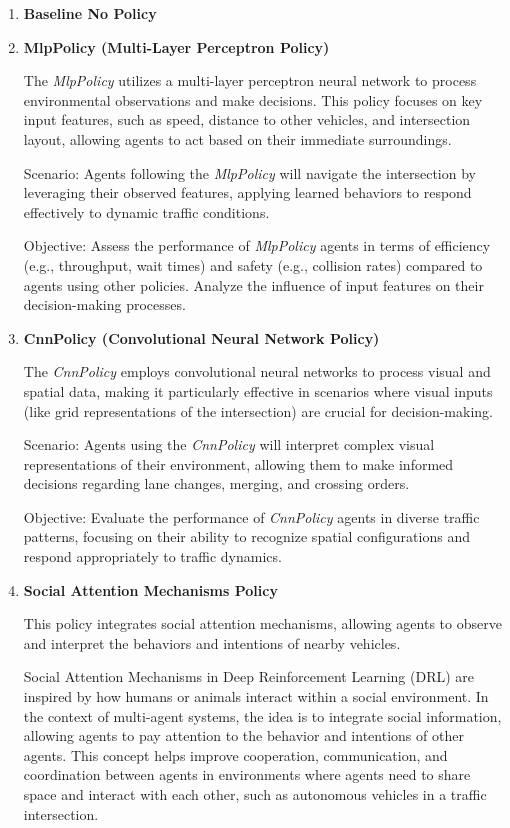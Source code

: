 \begin{enumerate}
    \item\textbf{Baseline {No Policy}}

    \item\textbf{MlpPolicy (Multi-Layer Perceptron Policy)}
    
    The \textit{MlpPolicy} utilizes a multi-layer perceptron neural network to process environmental observations and make decisions. This policy focuses on key input features, such as speed, distance to other vehicles, and intersection layout, allowing agents to act based on their immediate surroundings.

    Scenario: Agents following the \textit{MlpPolicy} will navigate the intersection by leveraging their observed features, applying learned behaviors to respond effectively to dynamic traffic conditions.

    Objective: Assess the performance of \textit{MlpPolicy} agents in terms of efficiency (e.g., throughput, wait times) and safety (e.g., collision rates) compared to agents using other policies. Analyze the influence of input features on their decision-making processes.

    \item\textbf{CnnPolicy (Convolutional Neural Network Policy)}
    
    The \textit{CnnPolicy} employs convolutional neural networks to process visual and spatial data, making it particularly effective in scenarios where visual inputs (like grid representations of the intersection) are crucial for decision-making.

    Scenario: Agents using the \textit{CnnPolicy} will interpret complex visual representations of their environment, allowing them to make informed decisions regarding lane changes, merging, and crossing orders.

    Objective: Evaluate the performance of \textit{CnnPolicy} agents in diverse traffic patterns, focusing on their ability to recognize spatial configurations and respond appropriately to traffic dynamics.

    \item\textbf{Social Attention Mechanisms Policy}
    
    This policy integrates social attention mechanisms, allowing agents to observe and interpret the behaviors and intentions of nearby vehicles. 

Social Attention Mechanisms in Deep Reinforcement Learning (DRL) are inspired by how humans or animals interact within a social environment.
In the context of multi-agent systems, the idea is to integrate social information, allowing agents to pay attention to the behavior and 
intentions of other agents.\cite{sutton2018reinforcement}
This concept helps improve cooperation, communication, and coordination between agents in environments where agents need to share space and interact with each other, such as autonomous vehicles in a traffic intersection.



\end{enumerate}
